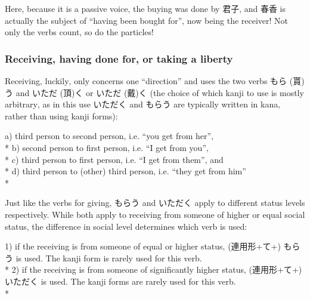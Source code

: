 \documentclass[11pt, b5paper, twoside, openright, onecolumn]{book}
\makeatletter
\newcommand*{\rubystack}[2]{{\relscale{0.5}%
  \begin{tabular}[b]{@{}c@{}}%
    {#1}\\%
   {\textscale{2}{#2}}%
  \end{tabular}}%
}
\DeclareRobustCommand*{\ruby}[2]{%
  \mbox{%
    \setlength{\parskip}{0ex}%
    \BeginAccSupp{method=pdfstringdef,ActualText={#1}}%
      \rubystack{\phantom{#2}}{#1}%
      \llap{%
        \rubystack{#2}{\phantom{#1}}%
      }%
    \EndAccSupp{}%
  }%
}
\renewcommand*{\ruby}[2]{#2 (#1)}%
\newenvironment{exampleblock}{
\setlength{\parindent}{0.6in}
\begin{minipage}[t]{\dimexpr\textwidth-\parindent}}
{\end{minipage}}
\makeatother
\begin{document}
Here‚ because it is a passive voice‚ the buying was done by 君子‚ and 春香 is actually the subject of “having been bought for”‚ now being the receiver! Not only the verbs count‚ so do the particles!

\subsubsection{Receiving‚ having done for‚ or taking a liberty}

Receiving‚ luckily‚ only concerns one “direction” and uses the two verbs \ruby{貰}{もら}う and \ruby{頂}{いただ}く or \ruby{戴}{いただ}く (the choice of which kanji to use is mostly arbitrary‚ as in this use いただく and もらう are typically written in kana‚ rather than using kanji forms):

\vspace{0.4cm}
\begin{exampleblock}
a) third person to second person‚ i.e. “you get from her”‚ \\* 
b) second person to first person‚ i.e. “I get from you”‚ \\* 
c) third person to first person‚ i.e. “I get from them”‚ and \\* 
d) third person to (other) third person‚ i.e. “they get from him” \\* 
\end{exampleblock}
\vspace{0.2cm}

Just like the verbs for giving‚ もらう and いただく apply to different status levels respectively. While both apply to receiving from someone of higher or equal social status‚ the difference in social level determines which verb is used:

\vspace{0.4cm}
\begin{exampleblock}
1) if the receiving is from someone of equal or higher status‚ (連用形+て+) もらう is used. The kanji form is rarely used for this verb. \\* 
2) if the receiving is from someone of significantly higher status‚ (連用形+て+) いただく is used. The kanji forms are rarely used for this verb. \\* 
\end{exampleblock}
\vspace{0.2cm}
\end{document}
